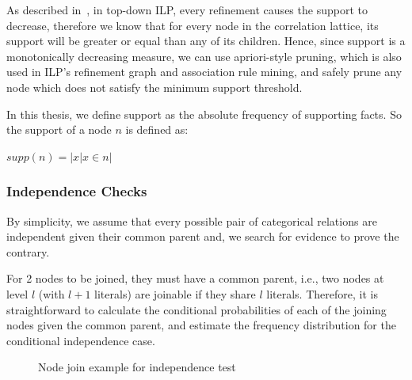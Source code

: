 As described in~\citet{LavracDz94}, in top-down ILP, every refinement causes the support to decrease, therefore we
know that for every node in the correlation lattice, its support will be greater or equal than any of its children.
Hence, since support is a monotonically decreasing measure, we can use apriori-style pruning, which is also used in
ILP's refinement graph and association rule mining, and safely prune any node which does not satisfy the minimum
support threshold.

In this thesis, we define support as the absolute frequency of supporting facts. So the support of a node $n$ is
defined as:

\begin{center}
$supp(n)=|{x|x \in n}|$ 
\end{center}


\subsubsection{Independence Checks}
\label{sec:indepchecks}

By simplicity, we assume that every possible pair of categorical relations are independent given their common parent
and, we search for evidence to prove the contrary.

For 2 nodes to be joined, they must have a common parent, i.e., two nodes at level $l$ (with $l+1$ literals) are
joinable if they share $l$ literals. Therefore, it is straightforward to calculate the conditional probabilities of each
of the joining nodes given the common parent, and estimate the frequency distribution for the conditional independence
case.

 
\begin{figure}[!h]
  \caption{Node join example for independence test}
  \centering
  \label{fig:joinIndepExample}
\end{figure}

